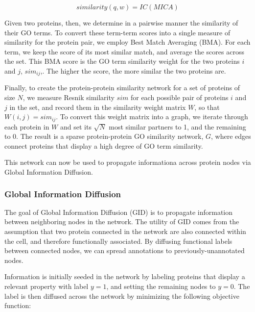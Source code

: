 \documentclass[12pt,a4paper]{report}
\begin{document}
\begin{equation*} \label{eq:resnik_equation}
 similarity(q,w) = IC(MICA)
\tag{13}
\end{equation*}

Given two proteins, then, we determine in a pairwise manner the similarity of their GO terms. To convert these term-term scores into a single measure of similarity for the protein pair, we employ Best Match Averaging (BMA). For each term, we keep the score of its most similar match, and average the scores across the set. This BMA score is the GO term similarity weight for the two proteins $i$ and $j$, $sim_{ij}$,. The higher the score, the more similar the two proteins are.

Finally, to create the protein-protein similarity network for a set of proteins of size $N$, we measure Resnik similarity $sim$ for each possible pair of proteins $i$ and $j$ in the set, and record them in the similarity weight matrix $W$, so that $W(i,j) = sim_{ij}$. To convert this weight matrix into a graph, we iterate through each protein in $W$ and set its $\sqrt{N}$ most similar partners to 1, and the remaining to 0. The result is a sparse protein-protein GO similarity network, $G$, where edges connect proteins that display a high degree of GO term similarity.


This network can now be used to propagate informationa across protein nodes via Global Information Diffusion.

\subsubsection{Global Information Diffusion}
The goal of Global Information Diffusion (GID) is to propagate information between neighboring nodes in the network. The utility of GID comes from the assumption that two protein connected in the network are also connected within the cell, and therefore functionally associated. By diffusing functional labels between connected nodes, we can spread annotations to previously-unannotated nodes.

Information is initially seeded in the network by labeling proteins that display a relevant property with label $y=1$, and setting the remaining nodes to $y=0$. The label is then diffused across the network by minimizing the following objective function:
\end{document}
